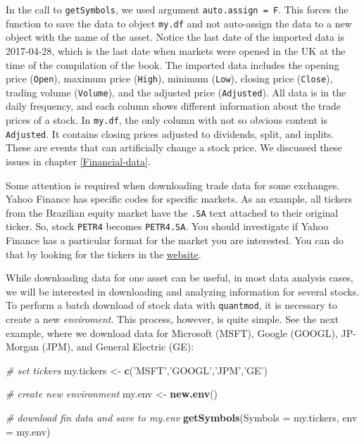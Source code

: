\documentclass[11pt,]{book}
\newenvironment{Shaded}{\begin{snugshade}}{\end{snugshade}}
\newcommand{\KeywordTok}[1]{\textcolor[rgb]{0.27,0.27,0.27}{\textbf{#1}}}
\newcommand{\DataTypeTok}[1]{\textcolor[rgb]{0.27,0.27,0.27}{#1}}
\newcommand{\StringTok}[1]{\textcolor[rgb]{0.5,0.5,0.5}{#1}}
\newcommand{\CommentTok}[1]{\textcolor[rgb]{0.56,0.35,0.01}{\textit{#1}}}
\newcommand{\NormalTok}[1]{#1}
\begin{document}
In the call to \texttt{getSymbols}, we used argument
\texttt{auto.assign\ =\ F}. This forces the function to save the data to
object \texttt{my.df} and not auto-assign the data to a new object with
the name of the asset. Notice the last date of the imported data is
2017-04-28, which is the last date when markets were opened in the UK at
the time of the compilation of the book. The imported data includes the
opening price (\texttt{Open}), maximum price (\texttt{High}), minimum
(\texttt{Low}), closing price (\texttt{Close}), trading volume
(\texttt{Volume}), and the adjusted price (\texttt{Adjusted}). All data
is in the daily frequency, and each column shows different information
about the trade prices of a stock. In \texttt{my.df}, the only column
with not so obvious content is \texttt{Adjusted}. It contains closing
prices adjusted to dividends, split, and inplits. These are events that
can artificially change a stock price. We discussed these issues in
chapter \ref{Financial-data}.

Some attention is required when downloading trade data for some
exchanges. Yahoo Finance has specific codes for specific markets. As an
example, all tickers from the Brazilian equity market have the
\texttt{.SA} text attached to their original ticker. So, stock
\texttt{PETR4} becomes \texttt{PETR4.SA}. You should investigate if
Yahoo Finance has a particular format for the market you are interested.
You can do that by looking for the tickers in the
\href{https://finance.yahoo.com/}{website}.

While downloading data for one asset can be useful, in most data
analysis cases, we will be interested in downloading and analyzing
information for several stocks. To perform a batch download of stock
data with \texttt{quantmod}, it is necessary to create a new
\emph{enviroment}. This process, however, is quite simple. See the next
example, where we download data for Microsoft (MSFT), Google (GOOGL),
JP-Morgan (JPM), and General Electric (GE): 

\begin{Shaded}
\begin{Highlighting}[]
\CommentTok{# set tickers}
\NormalTok{my.tickers <-}\StringTok{ }\KeywordTok{c}\NormalTok{(}\StringTok{'MSFT'}\NormalTok{,}\StringTok{'GOOGL'}\NormalTok{,}\StringTok{'JPM'}\NormalTok{,}\StringTok{'GE'}\NormalTok{)}

\CommentTok{# create new environment}
\NormalTok{my.env <-}\StringTok{ }\KeywordTok{new.env}\NormalTok{()}

\CommentTok{# download fin data and save to my.env}
\KeywordTok{getSymbols}\NormalTok{(}\DataTypeTok{Symbols =}\NormalTok{ my.tickers, }\DataTypeTok{env =}\NormalTok{ my.env)}
\end{Highlighting}
\end{Shaded}
\end{document}
